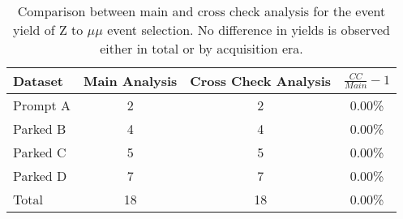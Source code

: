 \begin{table}[!htp]
\centering

\begin{tabular}{|l|c|c||c|}
  \hline
  Dataset & Main Analysis & Cross Check Analysis & $\frac{CC}{Main}-1$ \\ 
  \hline \hline
  Prompt A & 2 & 2 & 0.00\% \\
  Parked B & 4 & 4 & 0.00\% \\
  Parked C & 5 & 5 & 0.00\% \\
  Parked D & 7 & 7 & 0.00\% \\
  \hline \hline
  Total & 18 & 18 & 0.00\% \\
  \hline
\end{tabular}

\caption{Comparison between main and cross check analysis for the event yield of Z to $\mu\mu$ event selection. No difference in yields is observed either in total or by acquisition era.}
\end{table}